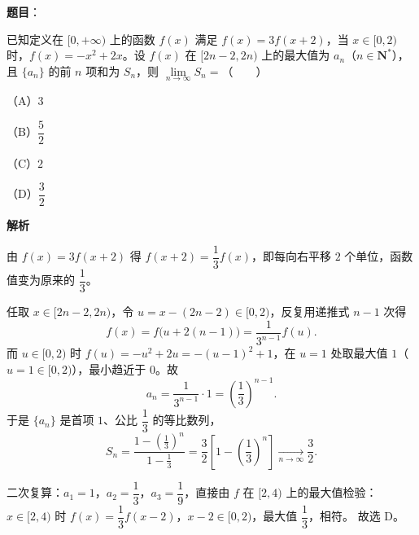 \begin{answer}

\textbf{题目}：

已知定义在 $[0,+\infty)$ 上的函数 $f(x)$ 满足 $f(x)=3f(x+2)$，当 $x\in[0,2)$ 时，$f(x)=-x^2+2x$。设 $f(x)$ 在 $[2n-2,2n)$ 上的最大值为 $a_n$（$n\in\mathbf N^*$），且 $\{a_n\}$ 的前 $n$ 项和为 $S_n$，则 $\lim\limits_{n\to\infty}S_n=$\mbox{（　　）}

（A）$3$

（B）$\dfrac52$

（C）$2$

（D）$\dfrac32$

\textbf{解析}

由 $f(x)=3f(x+2)$ 得 $f(x+2)=\dfrac13f(x)$，即每向右平移 $2$ 个单位，函数值变为原来的 $\dfrac13$。

任取 $x\in[2n-2,2n)$，令 $u=x-(2n-2)\in[0,2)$，反复用递推式 $n-1$ 次得
\nopagebreak[4]
\[f(x)=f\bigl(u+2(n-1)\bigr)=\frac{1}{3^{n-1}}f(u).\]
而 $u\in[0,2)$ 时 $f(u)=-u^2+2u=-(u-1)^2+1$，在 $u=1$ 处取最大值 $1$（$u=1\in[0,2)$），最小趋近于 $0$。故
\nopagebreak[4]
\[a_n=\frac{1}{3^{n-1}}\cdot1=\left(\frac13\right)^{n-1}.\]
于是 $\{a_n\}$ 是首项 $1$、公比 $\dfrac13$ 的等比数列，
\nopagebreak[4]
\[S_n=\frac{1-\left(\frac13\right)^n}{1-\frac13}=\frac32\left[1-\left(\frac13\right)^n\right]\xrightarrow[n\to\infty]{}\frac32.\]

二次复算：$a_1=1$，$a_2=\dfrac13$，$a_3=\dfrac19$，直接由 $f$ 在 $[2,4)$ 上的最大值检验：$x\in[2,4)$ 时 $f(x)=\dfrac13f(x-2)$，$x-2\in[0,2)$，最大值 $\dfrac13$，相符。
故选 D。


\end{answer}
